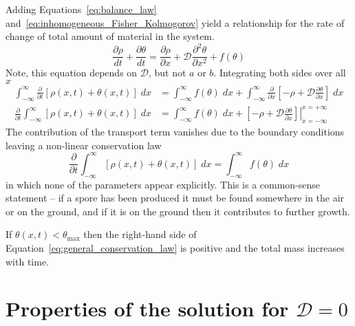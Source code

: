 \documentclass[12pt]{amsart}
\begin{document}
Adding Equations~\ref{eq:balance_law}
and~\ref{eq:inhomogeneous_Fisher_Kolmogorov} yield a relationship for
the rate of change of total amount of material in the system.
\begin{equation}
  \frac{\partial\rho}{dt} + \frac{\partial\theta}{dt} =
  \frac{\partial \rho}{\partial x} +
  \mathcal{D}\frac{\partial^2\theta}{\partial x^2} +
  f(\theta)
\end{equation}
Note, this equation depends on $\mathcal{D}$,
but not $a$ or $b$.  Integrating both sides over all $x$
\begin{align}
  \int_{-\infty}^{\infty} \frac{\partial}{\partial t} \left[\rho(x,
    t)+\theta(x,t)\right]\; dx &=
  \int_{-\infty}^{\infty} f(\theta) \; dx +
  \int_{-\infty}^{\infty} \frac{\partial}{\partial x} \left[-\rho +
    \mathcal{D}\frac{\partial \theta}{\partial x}\right]\; dx \\
  \frac{\partial}{\partial t} \int_{-\infty}^{\infty}
  \left[\rho(x, t)+\theta(x,t)\right]\; dx &=
  \int_{-\infty}^{\infty} f(\theta) \; dx + \left.\left[-\rho +
    \mathcal{D}\frac{\partial \theta}{\partial
      x}\right]\right|_{x=-\infty}^{x=+\infty}
 \end{align}
The contribution of the transport term vanishes due to the boundary
conditions leaving a non-linear conservation law
\begin{equation}
  \frac{\partial}{\partial t} \int_{-\infty}^{\infty}
  \left[\rho(x, t)+\theta(x,t)\right]\; dx = \int_{-\infty}^{\infty}
  f(\theta) \; dx
  \label{eq:general_conservation_law}
\end{equation}
in which none of the parameters appear explicitly.  This is a
common-sense statement -- if a spore has been produced it must be
found somewhere in the air or on the ground, and if it is on the
ground then it contributes to further growth.

If $\theta(x, t) < \theta_{\max}$ then the right-hand side of
Equation~\ref{eq:general_conservation_law} is positive and the total
mass increases with time.


\section{Properties of the solution for $\mathcal{D}=0$}
\end{document}
